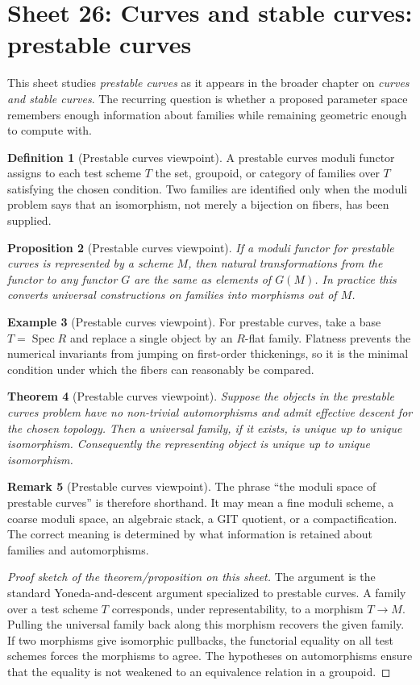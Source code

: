 \documentclass[11pt]{amsart}
\newtheorem{theorem}{Theorem}[section]
\newtheorem{proposition}[theorem]{Proposition}
\theoremstyle{definition}
\newtheorem{definition}[theorem]{Definition}
\newtheorem{example}[theorem]{Example}
\newtheorem{remark}[theorem]{Remark}
\newcommand{\Spec}{\operatorname{Spec}}
\begin{document}
\section{Sheet 26: Curves and stable curves: prestable curves}
This sheet studies \emph{prestable curves} as it appears in the broader chapter on \emph{curves and stable curves}.  The recurring question is whether a proposed parameter space remembers enough information about families while remaining geometric enough to compute with.
\begin{definition}[Prestable curves viewpoint]
A prestable curves moduli functor assigns to each test scheme $T$ the set, groupoid, or category of families over $T$ satisfying the chosen condition.  Two families are identified only when the moduli problem says that an isomorphism, not merely a bijection on fibers, has been supplied.
\end{definition}
\begin{proposition}[Prestable curves viewpoint]
If a moduli functor for prestable curves is represented by a scheme $M$, then natural transformations from the functor to any functor $G$ are the same as elements of $G(M)$.  In practice this converts universal constructions on families into morphisms out of $M$.
\end{proposition}
\begin{example}[Prestable curves viewpoint]
For prestable curves, take a base $T=\Spec R$ and replace a single object by an $R$-flat family.  Flatness prevents the numerical invariants from jumping on first-order thickenings, so it is the minimal condition under which the fibers can reasonably be compared.
\end{example}
\begin{theorem}[Prestable curves viewpoint]
Suppose the objects in the prestable curves problem have no non-trivial automorphisms and admit effective descent for the chosen topology.  Then a universal family, if it exists, is unique up to unique isomorphism.  Consequently the representing object is unique up to unique isomorphism.
\end{theorem}
\begin{remark}[Prestable curves viewpoint]
The phrase ``the moduli space of prestable curves'' is therefore shorthand.  It may mean a fine moduli scheme, a coarse moduli space, an algebraic stack, a GIT quotient, or a compactification.  The correct meaning is determined by what information is retained about families and automorphisms.
\end{remark}
\begin{proof}[Proof sketch of the theorem/proposition on this sheet]
The argument is the standard Yoneda-and-descent argument specialized to prestable curves.  A family over a test scheme $T$ corresponds, under representability, to a morphism $T\to M$.  Pulling the universal family back along this morphism recovers the given family.  If two morphisms give isomorphic pullbacks, the functorial equality on all test schemes forces the morphisms to agree.  The hypotheses on automorphisms ensure that the equality is not weakened to an equivalence relation in a groupoid.
\end{proof}
\end{document}

